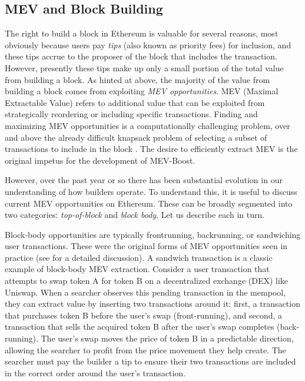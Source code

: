 \documentclass[12pt,reqno]{amsart}
\begin{document}
\subsection{MEV and Block Building} \label{sec:mev}
The right to build a block in Ethereum is valuable for several reasons, most obviously because users pay \textit{tips} (also known as priority fees) for inclusion, and these tips accrue to the proposer of the block that includes the transaction. However, presently these tips make up only a small portion of the total value from building a block. As hinted at above, the majority of the value from building a block comes from exploiting \emph{MEV opportunities}. MEV (Maximal Extractable Value) refers to additional value that can be exploited from strategically reordering or including specific transactions. Finding and maximizing MEV opportunities is a computationally challenging problem, over and above the already difficult knapsack problem of selecting a subset of transactions to include in the block \citep{mohan2024knapsack}. The desire to efficiently extract MEV is the original impetus for the development of MEV-Boost. 

However, over the past year or so there has been substantial evolution in our understanding of how builders operate. To understand this, it is useful to discuss current MEV opportunities on Ethereum. These can be broadly segmented into two categories: \textit{top-of-block} and \textit{block body}. Let us describe each in turn. 

Block-body opportunities are typically frontrunning, backrunning, or sandwiching user transactions. These were the original forms of MEV opportunities seen in practice (see \cite{daian2020flash} for a detailed discussion).  A sandwich transaction is a classic example of block-body MEV extraction. Consider a user transaction that attempts to swap token A for token B on a decentralized exchange (DEX) like Uniswap. When a searcher observes this pending transaction in the mempool, they can extract value by inserting two transactions around it: first, a transaction that purchases token B before the user's swap (front-running), and second, a transaction that sells the acquired token B after the user's swap completes (back-running). The user's swap moves the price of token B in a predictable direction, allowing the searcher to profit from the price movement they help create. The searcher must pay the builder a tip to ensure their two transactions are included in the correct order around the user's transaction.
\end{document}
